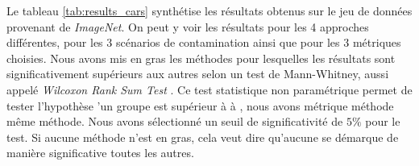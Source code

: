 Le tableau \ref{tab:results_cars} synthétise les résultats obtenus sur le jeu de données provenant de \textit{ImageNet}. On peut y voir les résultats pour les 4 approches différentes, pour les 3 scénarios de contamination ainsi que pour les 3 métriques choisies. Nous avons mis en gras les méthodes pour lesquelles les résultats sont significativement supérieurs aux autres selon un test de Mann-Whitney, aussi appelé \textit{Wilcoxon Rank Sum Test} \citep{Mann47}. Ce test statistique non paramétrique permet de tester l'hypothèse \DIFdelbegin {}\DIFdelend \DIFaddbegin {}\DIFaddend 'un groupe est \DIFdelbegin {}\DIFdelend supérieur à \DIFdelbegin {}\DIFdelend \DIFaddbegin {}\DIFaddend à \DIFdelbegin {}\DIFdelend \DIFaddbegin {}\DIFaddend , nous avons \DIFdelbegin {}\DIFdelend \DIFaddbegin {}\DIFaddend métrique \DIFdelbegin {}\DIFdelend \DIFaddbegin {}\DIFaddend méthode \DIFdelbegin {}\DIFdelend \DIFaddbegin {}\DIFaddend même \DIFdelbegin {}\DIFdelend \DIFaddbegin {}\DIFaddend méthode\DIFdelbegin {}\DIFdelend . Nous avons sélectionné un seuil de significativité de $5 \%$ pour le test. \DIFaddbegin {}\DIFaddend Si aucune méthode n'est en gras, cela veut dire qu'aucune \DIFaddbegin {}\DIFaddend se démarque de manière significative \DIFdelbegin {}\DIFdelend \DIFaddbegin {}\DIFaddend toutes les autres. 

